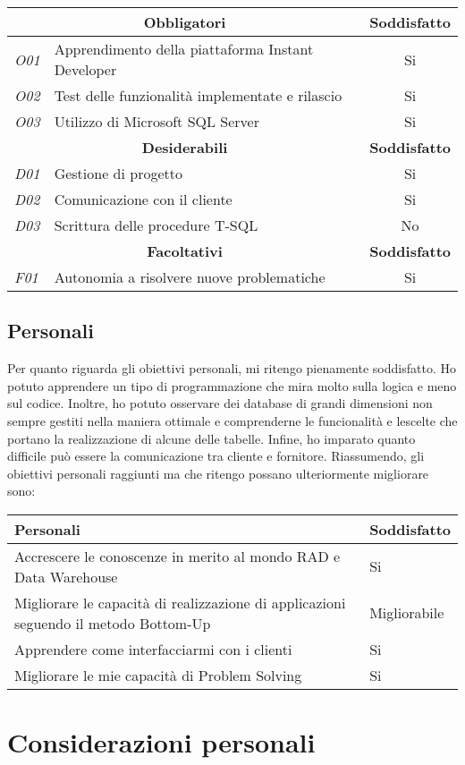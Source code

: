 \begin{center}
	\begin{tabular}{ l|l|c }
		\hline
		
		\multicolumn{2}{c}{\textbf{Obbligatori}} & \textbf{Soddisfatto} \\
		\hline
		\textit{O01} & Apprendimento della piattaforma Instant Developer & Si\\
		\textit{O02} & Test delle funzionalità implementate e rilascio & Si\\
		\textit{O03} & Utilizzo di Microsoft SQL Server& Si\\
		\hline
		\multicolumn{2}{c}{\textbf{Desiderabili}} & \textbf{Soddisfatto}\\
		\hline
		\textit{D01} & Gestione di progetto & Si\\
		\textit{D02} & Comunicazione con il cliente & Si\\
		\textit{D03} & Scrittura delle procedure T-SQL& No\\
		\hline
		\multicolumn{2}{c}{\textbf{Facoltativi}} & \textbf{Soddisfatto}\\
		\hline
		\textit{F01} & Autonomia a risolvere nuove problematiche & Si
		
	\end{tabular}
\end{center}
	

\subsection{Personali}
Per quanto riguarda gli obiettivi personali, mi ritengo pienamente soddisfatto. Ho potuto apprendere un tipo di programmazione che mira molto sulla logica e meno sul codice. Inoltre, ho potuto osservare dei database di grandi dimensioni non sempre gestiti nella maniera ottimale e comprenderne le funcionalità e lescelte che portano la realizzazione di alcune delle tabelle. Infine, ho imparato quanto difficile può essere la comunicazione tra cliente e fornitore.
Riassumendo, gli obiettivi personali raggiunti ma che ritengo possano ulteriormente migliorare sono:


\begin{center}
	\begin{tabular}{l|l}
		\hline
		\textbf{Personali}& \textbf{Soddisfatto} \\
		\hline
		Accrescere le conoscenze in merito al mondo RAD e Data Warehouse & Si\\
		Migliorare le capacità di realizzazione di applicazioni seguendo il metodo Bottom-Up & Migliorabile\\
		Apprendere come interfacciarmi con i clienti & Si\\
		Migliorare le mie capacità di Problem Solving & Si

	\end{tabular}
\end{center}


\section{Considerazioni personali}

